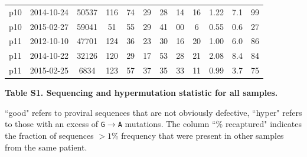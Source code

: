\documentclass[aps,rmp,onecolumn,linenumbers]{revtex4-1}
\begin{document}
\begin{table}
\begin{tabular}{|cccc|ccc|ccc|cc|}
p10 & 2014-10-24 & 50537 & 116 & 74 & 29 & 28 & 14 & 16 & 1.22 & 7.1 & 99\\
p10 & 2015-02-27 & 59041 & 51 & 55 & 29 & 41 & 00 & 6 & 0.55 & 0.6 & 27\\
p11 & 2012-10-10 & 47701 & 124 & 36 & 23 & 30 & 16 & 20 & 1.00 & 6.0 & 86\\
p11 & 2014-10-22 & 32126 & 120 & 29 & 17 & 53 & 28 & 21 & 2.08 & 8.4 & 84\\
p11 & 2015-02-25 & 6834 & 123 & 57 & 37 & 35 & 33 & 11 & 0.99 & 3.7 & 75\\\hline
\end{tabular}
\begin{flushleft}
    {\bf Table S1. Sequencing and hypermutation statistic for all samples.}\normalsize
 
{ ``good" refers to proviral sequences that are not obviously defective, ``hyper" refers to those with an excess of \texttt{G}$\to$\texttt{A} mutations. The column ``\% recaptured" indicates the fraction of sequences $>1$\% frequency that were present in other samples from the same patient.}
\end{flushleft}
\label{tab:hypermut_stats}
\end{table}
\end{document}
